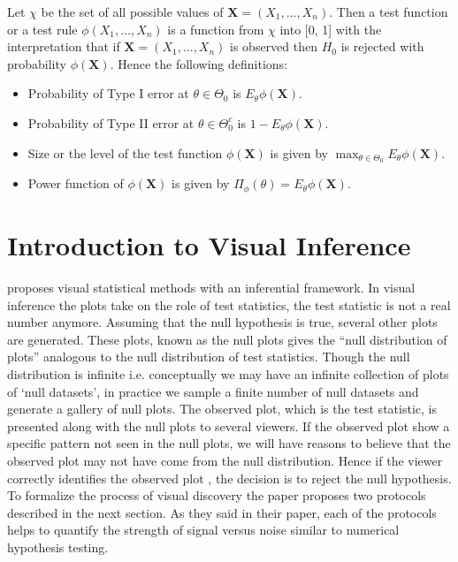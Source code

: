 \documentclass[12]{report}
\begin{document}
Let $\chi$ be the set of all possible values of $\mathbf{X} = (X_1, \dots, X_n)$. Then a test function or a test rule $\phi(X_1, \dots, X_n)$ is a function from $\chi$ into [0, 1] with the interpretation that if $\mathbf{X} = (X_1, \dots, X_n)$ is observed then $H_0$ is rejected with probability $\phi( \mathbf{X})$. Hence the following definitions:
\begin{itemize}
\item Probability of Type I error at $\theta \in \Theta_0$ is $E_{\theta} \phi(\mathbf{X})$. 
\item Probability of Type II error at $\theta \in \Theta_0^c$ is $1 - E_{\theta} \phi(\mathbf{X})$. \item Size or the level of the test function $\phi(\mathbf{X})$ is given by $\max_{\theta \in \Theta_0} E_{\theta} \phi(\mathbf{X}) $.
\item Power function of $ \phi(\mathbf{X})$ is given by $\Pi_{\phi}(\theta) = E_{\theta} \phi(\mathbf{X})$.
\end{itemize}


\section{Introduction to Visual Inference} \citet{buja:2009} proposes visual statistical methods with an inferential framework. In visual inference the plots take on the role of test statistics, the test statistic is not a real number anymore. Assuming that the null hypothesis is true, several other plots are generated. These plots, known as the null plots gives the ``null distribution of plots'' analogous to the null distribution of test statistics. Though the null distribution is infinite i.e. conceptually we may have an infinite collection of plots of `null datasets', in practice we sample a finite number of null datasets and generate a gallery of null plots. The observed plot, which is the test statistic, is presented along with the null plots to several viewers. If the observed plot show a specific pattern not seen in the null plots, we will have reasons to believe that the observed plot may not have come from the null distribution. Hence if the viewer correctly identifies the observed plot , the decision is to reject the null hypothesis. To formalize the process of visual discovery the paper proposes two protocols described in the next section. As they said in their paper, each of the protocols helps to quantify the strength of signal versus noise similar to numerical hypothesis testing. 
\end{document}
